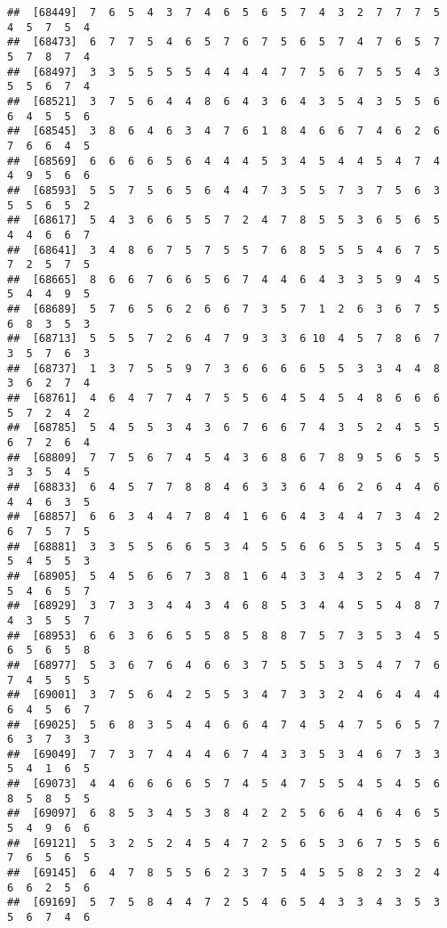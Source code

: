 \documentclass[
]{book}
\begin{document}
\begin{verbatim}
##  [68449]  7  6  5  4  3  7  4  6  5  6  5  7  4  3  2  7  7  7  5  4  5  7  5  4
##  [68473]  6  7  7  5  4  6  5  7  6  7  5  6  5  7  4  7  6  5  7  5  7  8  7  4
##  [68497]  3  3  5  5  5  5  4  4  4  4  7  7  5  6  7  5  5  4  3  5  5  6  7  4
##  [68521]  3  7  5  6  4  4  8  6  4  3  6  4  3  5  4  3  5  5  6  6  4  5  5  6
##  [68545]  3  8  6  4  6  3  4  7  6  1  8  4  6  6  7  4  6  2  6  7  6  6  4  5
##  [68569]  6  6  6  6  5  6  4  4  4  5  3  4  5  4  4  5  4  7  4  4  9  5  6  6
##  [68593]  5  5  7  5  6  5  6  4  4  7  3  5  5  7  3  7  5  6  3  5  5  6  5  2
##  [68617]  5  4  3  6  6  5  5  7  2  4  7  8  5  5  3  6  5  6  5  4  4  6  6  7
##  [68641]  3  4  8  6  7  5  7  5  5  7  6  8  5  5  5  4  6  7  5  7  2  5  7  5
##  [68665]  8  6  6  7  6  6  5  6  7  4  4  6  4  3  3  5  9  4  5  5  4  4  9  5
##  [68689]  5  7  6  5  6  2  6  6  7  3  5  7  1  2  6  3  6  7  5  6  8  3  5  3
##  [68713]  5  5  5  7  2  6  4  7  9  3  3  6 10  4  5  7  8  6  7  3  5  7  6  3
##  [68737]  1  3  7  5  5  9  7  3  6  6  6  6  5  5  3  3  4  4  8  3  6  2  7  4
##  [68761]  4  6  4  7  7  4  7  5  5  6  4  5  4  5  4  8  6  6  6  5  7  2  4  2
##  [68785]  5  4  5  5  3  4  3  6  7  6  6  7  4  3  5  2  4  5  5  6  7  2  6  4
##  [68809]  7  7  5  6  7  4  5  4  3  6  8  6  7  8  9  5  6  5  5  3  3  5  4  5
##  [68833]  6  4  5  7  7  8  8  4  6  3  3  6  4  6  2  6  4  4  6  4  4  6  3  5
##  [68857]  6  6  3  4  4  7  8  4  1  6  6  4  3  4  4  7  3  4  2  6  7  5  7  5
##  [68881]  3  3  5  5  6  6  5  3  4  5  5  6  6  5  5  3  5  4  5  5  4  5  5  3
##  [68905]  5  4  5  6  6  7  3  8  1  6  4  3  3  4  3  2  5  4  7  5  4  6  5  7
##  [68929]  3  7  3  3  4  4  3  4  6  8  5  3  4  4  5  5  4  8  7  4  3  5  5  7
##  [68953]  6  6  3  6  6  5  5  8  5  8  8  7  5  7  3  5  3  4  5  6  5  6  5  8
##  [68977]  5  3  6  7  6  4  6  6  3  7  5  5  5  3  5  4  7  7  6  7  4  5  5  5
##  [69001]  3  7  5  6  4  2  5  5  3  4  7  3  3  2  4  6  4  4  4  6  4  5  6  7
##  [69025]  5  6  8  3  5  4  4  6  6  4  7  4  5  4  7  5  6  5  7  6  3  7  3  3
##  [69049]  7  7  3  7  4  4  4  6  7  4  3  3  5  3  4  6  7  3  3  5  4  1  6  5
##  [69073]  4  4  6  6  6  6  5  7  4  5  4  7  5  5  4  5  4  5  6  8  5  8  5  5
##  [69097]  6  8  5  3  4  5  3  8  4  2  2  5  6  6  4  6  4  6  5  5  4  9  6  6
##  [69121]  5  3  2  5  2  4  5  4  7  2  5  6  5  3  6  7  5  5  6  7  6  5  6  5
##  [69145]  6  4  7  8  5  5  6  2  3  7  5  4  5  5  8  2  3  2  4  6  6  2  5  6
##  [69169]  5  7  5  8  4  4  7  2  5  4  6  5  4  3  3  4  3  5  3  5  6  7  4  6

\end{verbatim}
\end{document}

